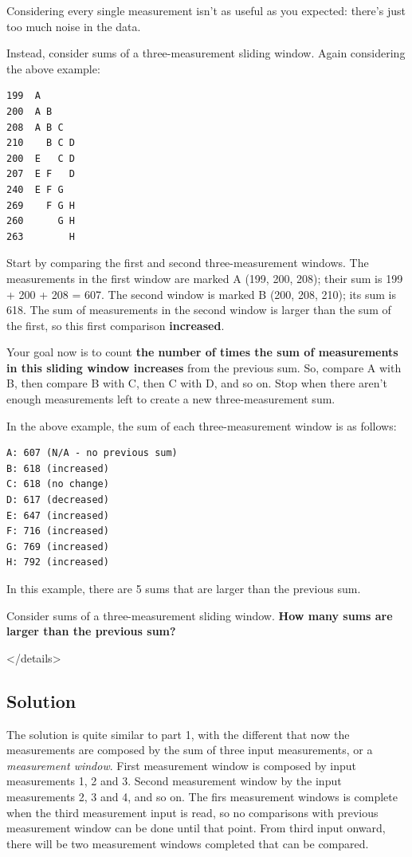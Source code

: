 \documentclass[11pt]{article}
\begin{document}
Considering every single measurement isn't as useful as you expected: there's
just too much noise in the data.

Instead, consider sums of a three-measurement sliding window. Again considering
the above example:

\begin{verbatim}
199  A
200  A B
208  A B C
210    B C D
200  E   C D
207  E F   D
240  E F G
269    F G H
260      G H
263        H
\end{verbatim}


Start by comparing the first and second three-measurement windows. The
measurements in the first window are marked A (199, 200, 208); their sum is
199 + 200 + 208 = 607. The second window is marked B (200, 208, 210); its sum
is 618. The sum of measurements in the second window is larger than the sum of
the first, so this first comparison \textbf{increased}.

Your goal now is to count \textbf{the number of times the sum of measurements in this
sliding window increases} from the previous sum. So, compare A with B, then
compare B with C, then C with D, and so on. Stop when there aren't enough
measurements left to create a new three-measurement sum.

In the above example, the sum of each three-measurement window is as follows:

\begin{verbatim}
A: 607 (N/A - no previous sum)
B: 618 (increased)
C: 618 (no change)
D: 617 (decreased)
E: 647 (increased)
F: 716 (increased)
G: 769 (increased)
H: 792 (increased)
\end{verbatim}

In this example, there are 5 sums that are larger than the previous sum.

Consider sums of a three-measurement sliding window. \textbf{How many sums are larger
than the previous sum?}

\begin{html}
</details>
\end{html}

\subsection{Solution}
\label{sec:org6066d15}
The solution is quite similar to part 1, with the different that now the
measurements are composed by the sum of three input measurements, or a
\emph{measurement window}. First measurement window is composed by input measurements
1, 2 and 3. Second measurement window by the input measurements 2, 3 and 4, and
so on. The firs measurement windows is complete when the third measurement input
is read, so no comparisons with previous measurement window can be done until
that point. From third input onward, there will be two measurement windows
completed that can be compared.
\end{document}
